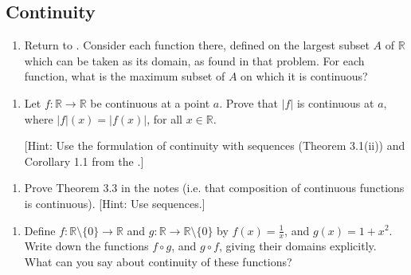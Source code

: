 \documentclass[letterpaper,10pt,english]{jupyterBook}
\begin{document}
\subsection{Continuity}
\label{\detokenize{Problems:continuity}}\label{\detokenize{Problems:id13}}\begin{enumerate}
%
\setcounter{enumi}{12}
\item {} 
\sphinxAtStartPar
Return to {\hyperref[\detokenize{Problems:id1}]{}}. Consider each function there, defined on the largest subset \(A\) of \(\mathbb{R}\)
which can be taken as its domain, as found in that problem. For each function, what is the maximum subset of \(A\) on which it is continuous?

\end{enumerate}
\label{\detokenize{Problems:id14}}\begin{enumerate}
%
\setcounter{enumi}{13}
\item {} 
\sphinxAtStartPar
Let \(f: \mathbb{R} \rightarrow \mathbb{R}\) be continuous at a point \(a\).
Prove that \(|f|\) is continuous at \(a\), where \(|f|(x) = |f(x)|\), for all \(x \in \mathbb{R}\).

{[}Hint: Use the formulation of continuity with sequences (Theorem 3.1(ii)) and Corollary 1.1 from the .{]}

\end{enumerate}
\label{\detokenize{Problems:id15}}\begin{enumerate}
%
\setcounter{enumi}{14}
\item {} 
\sphinxAtStartPar
Prove Theorem 3.3 in the notes (i.e. that composition of continuous functions is continuous). {[}Hint: Use sequences.{]}

\end{enumerate}
\label{\detokenize{Problems:id16}}\begin{enumerate}
%
\setcounter{enumi}{15}
\item {} 
\sphinxAtStartPar
Define \(f:\mathbb{R} \setminus \{0\}\to \mathbb{R}\) and \(g: \mathbb{R} \rightarrow \mathbb{R}\setminus \{0\}\) by \(f(x) = \frac{1}{x}\), and \(g(x) = 1 + x^{2}\). Write down the functions \(f \circ g\), and \(g \circ f\), giving their domains explicitly. What can you say about continuity of these functions?

\end{enumerate}
\end{document}

